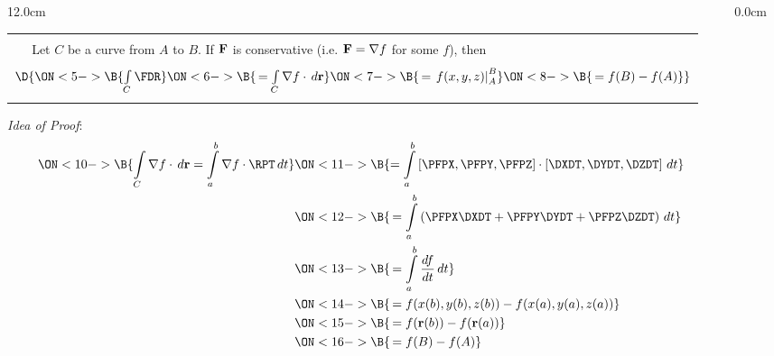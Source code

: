 \begin{frame}
\begin{columns}\begin{column}{12.0cm}

\scriptsize

\begin{center}
{\setlength{\extrarowheight}{-0.1cm}
\begin{tabular}{|p{0.4cm}p{10.6cm}|}
	\hline
	\hline
	&\\
	\THM & Let $C$ be a curve from $A$ to $B$.  If ${\bf F}$ is conservative (i.e. ${\bf F} = \nabla f$ for some $f$), then \\
	& \\
	\multicolumn{2}{|c|}{$\D{
	\ON<5->{\B{\int \limits_{C} \FDR }}
	\ON<6->{\B{\, = \int \limits_{C} \nabla f \cdot \, d{\bf r} }}
	\ON<7->{\B{\, = \left.f(x,y,z)\right|_A^B }}
	\ON<8->{\B{\, = f(B) - f(A)}}}$} \\
	&\\
	\hline
	\hline
\end{tabular}}
\end{center}
{\em Idea of Proof}:  
\begin{align*}
\ON<10->{\B{\int \limits_{C} \nabla f \cdot \, d{\bf r} = \int \limits_{a}^{b} \nabla f \cdot \RPT \, dt }} 
& \ON<11->{\B{= \int \limits_{a}^{b} \left[\PFPX,\PFPY,\PFPZ\right] \cdot \left[\DXDT,\DYDT,\DZDT\right] \, dt}} \\
& \ON<12->{\B{\, = \int \limits_{a}^{b} \left(\PFPX\DXDT + \PFPY\DYDT + \PFPZ\DZDT\right) \, dt}} \\
& \ON<13->{\B{\, = \int \limits_{a}^{b} \frac{df}{dt} \, dt}} \\
& \ON<14->{\B{\, = f(x(b),y(b),z(b)) - f(x(a),y(a),z(a))}} \\
& \ON<15->{\B{\, = f({\bf r}(b)) - f({\bf r}(a))}} \\
& \ON<16->{\B{\, = f(B) - f(A)}} \\
\end{align*}

\vspace{0.2cm}

\end{column}\begin{column}{0.0cm}\end{column}\end{columns}
\end{frame}

